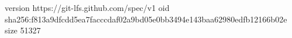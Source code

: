 version https://git-lfs.github.com/spec/v1
oid sha256:f813a9dfcdd5ea7facccdaf02a9bd05e0bb3494e143baa62980edfb12166b02e
size 51327
